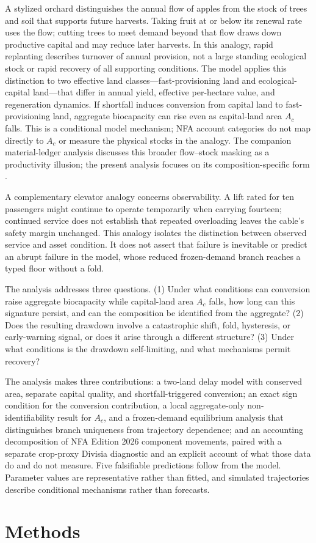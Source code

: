 \documentclass[preprint,12pt,authoryear]{elsarticle}
\begin{document}
A stylized orchard distinguishes the annual flow of apples from the stock of trees and soil that supports future harvests. Taking fruit at or below its renewal rate uses the flow; cutting trees to meet demand beyond that flow draws down productive capital and may reduce later harvests. In this analogy, rapid replanting describes turnover of annual provision, not a large standing ecological stock or rapid recovery of all supporting conditions. The model applies this distinction to two effective land classes—fast-provisioning land and ecological-capital land—that differ in annual yield, effective per-hectare value, and regeneration dynamics. If shortfall induces conversion from capital land to fast-provisioning land, aggregate biocapacity can rise even as capital-land area $A_c$ falls. This is a conditional model mechanism; NFA account categories do not map directly to $A_c$ or measure the physical stocks in the analogy. The companion material-ledger analysis discusses this broader flow--stock masking as a productivity illusion; the present analysis focuses on its composition-specific form \citep{Abaee2026c}.

A complementary elevator analogy concerns observability. A lift rated for ten passengers might continue to operate temporarily when carrying fourteen; continued service does not establish that repeated overloading leaves the cable's safety margin unchanged. This analogy isolates the distinction between observed service and asset condition. It does not assert that failure is inevitable or predict an abrupt failure in the model, whose reduced frozen-demand branch reaches a typed floor without a fold.

The analysis addresses three questions. (1) Under what conditions can conversion raise aggregate biocapacity while capital-land area $A_c$ falls, how long can this signature persist, and can the composition be identified from the aggregate? (2) Does the resulting drawdown involve a catastrophic shift, fold, hysteresis, or early-warning signal, or does it arise through a different structure? (3) Under what conditions is the drawdown self-limiting, and what mechanisms permit recovery?

The analysis makes three contributions: a two-land delay model with conserved area, separate capital quality, and shortfall-triggered conversion; an exact sign condition for the conversion contribution, a local aggregate-only non-identifiability result for $A_c$, and a frozen-demand equilibrium analysis that distinguishes branch uniqueness from trajectory dependence; and an accounting decomposition of NFA Edition 2026 component movements, paired with a separate crop-proxy Divisia diagnostic and an explicit account of what those data do and do not measure. Five falsifiable predictions follow from the model. Parameter values are representative rather than fitted, and simulated trajectories describe conditional mechanisms rather than forecasts.\section{Methods}\label{sec:model}
\end{document}
